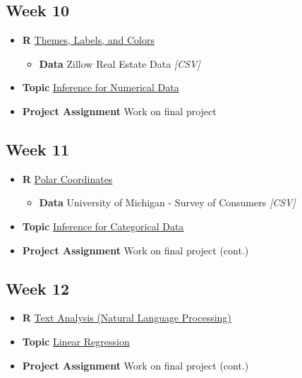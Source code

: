 \documentclass[]{book}
\providecommand{\tightlist}{%
  \setlength{\itemsep}{0pt}\setlength{\parskip}{0pt}}
\theoremstyle{definition}
\theoremstyle{definition}
\theoremstyle{remark}
\begin{document}
\subsection*{Week 10}\label{week-10}

\begin{itemize}
\tightlist
\item
  \textbf{R} \protect\hyperlink{themes-labels-colors}{Themes, Labels,
  and Colors}

  \begin{itemize}
  \tightlist
  \item
    \textbf{Data} Zillow Real Estate Data \emph{{[}CSV{]}}
  \end{itemize}
\item
  \textbf{Topic} \protect\hyperlink{inference-numerical}{Inference for
  Numerical Data}
\item
  \textbf{Project Assignment} Work on final project
\end{itemize}

\subsection*{Week 11}\label{week-11}

\begin{itemize}
\tightlist
\item
  \textbf{R} \protect\hyperlink{polar}{Polar Coordinates}

  \begin{itemize}
  \tightlist
  \item
    \textbf{Data} University of Michigan - Survey of Consumers
    \emph{{[}CSV{]}}
  \end{itemize}
\item
  \textbf{Topic} \protect\hyperlink{inference-categorical}{Inference for
  Categorical Data}
\item
  \textbf{Project Assignment} Work on final project (cont.)
\end{itemize}

\subsection*{Week 12}\label{week-12}

\begin{itemize}
\tightlist
\item
  \textbf{R} \protect\hyperlink{nlp}{Text Analysis (Natural Language
  Processing)} 
\item
  \textbf{Topic} \protect\hyperlink{linear-regression}{Linear
  Regression}
\item
  \textbf{Project Assignment} Work on final project (cont.)
\end{itemize}
\end{document}
